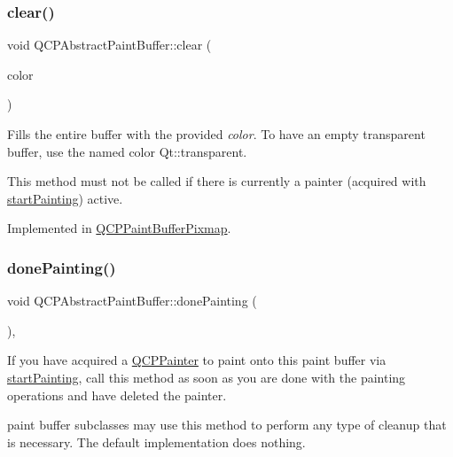 \subsubsection{\texorpdfstring{clear()}{clear()}}
{\footnotesize\ttfamily void Q\+C\+P\+Abstract\+Paint\+Buffer\+::clear (\begin{DoxyParamCaption}\item[{const Q\+Color \&}]{color }\end{DoxyParamCaption})\hspace{0.3cm}{\ttfamily [pure virtual]}}

Fills the entire buffer with the provided {\itshape color}. To have an empty transparent buffer, use the named color {\ttfamily Qt\+::transparent}.

This method must not be called if there is currently a painter (acquired with \mbox{\hyperlink{class_q_c_p_abstract_paint_buffer_a9e9f29b19c033cf02fb96f1a148463f3}{start\+Painting}}) active. 

Implemented in \mbox{\hyperlink{class_q_c_p_paint_buffer_pixmap_a14badbd010a3cde6b55817ccb7b65217}{Q\+C\+P\+Paint\+Buffer\+Pixmap}}.

\mbox{\label{class_q_c_p_abstract_paint_buffer_a41b0dc6e7744f19fae09f8532c207dc1}} 
\subsubsection{\texorpdfstring{done\+Painting()}{donePainting()}}
{\footnotesize\ttfamily void Q\+C\+P\+Abstract\+Paint\+Buffer\+::done\+Painting (\begin{DoxyParamCaption}{ }\end{DoxyParamCaption})\hspace{0.3cm}{\ttfamily [inline]}, {\ttfamily [virtual]}}

If you have acquired a \mbox{\hyperlink{class_q_c_p_painter}{Q\+C\+P\+Painter}} to paint onto this paint buffer via \mbox{\hyperlink{class_q_c_p_abstract_paint_buffer_a9e9f29b19c033cf02fb96f1a148463f3}{start\+Painting}}, call this method as soon as you are done with the painting operations and have deleted the painter.

paint buffer subclasses may use this method to perform any type of cleanup that is necessary. The default implementation does nothing. \mbox{\label{class_q_c_p_abstract_paint_buffer_afb998c7525e3ae37d9d2d46c7aaf461a}} 
